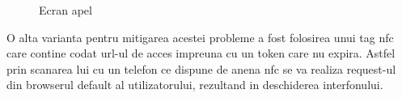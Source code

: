 \begin{figure}[H]
\begin{center}
  \hfil
  \caption{Ecran apel}
  \label{fig:ringing}
\end{center}
\end{figure}

O alta varianta pentru mitigarea acestei probleme a fost folosirea unui tag \acrfull{nfc} care contine codat url-ul de acces impreuna cu un token care nu expira. Astfel prin scanarea lui cu un telefon ce dispune de anena \acrshort{nfc} se va realiza request-ul din browserul default al utilizatorului, rezultand in deschiderea interfonului.